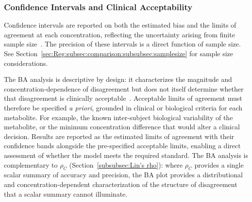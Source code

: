 \subsubsection{Confidence Intervals and Clinical Acceptability}
Confidence intervals are reported on both the estimated bias and the limits of agreement at each concentration, reflecting the uncertainty arising from finite sample size~\cite{Lu2016}. The precision of these intervals is a direct function of sample size. See Section~\ref{sec:Reg:subsec:comparison:subsubsec:samplesize} for sample size considerations.

The BA analysis is descriptive by design: it characterizes the magnitude and concentration-dependence of disagreement but does not itself determine whether that disagreement is clinically acceptable~\cite{Silveira2024}. Acceptable limits of agreement must therefore be specified \textit{a priori}, grounded in clinical or biological criteria for each metabolite. For example, the known inter-subject biological variability of the metabolite, or the minimum concentration difference that would alter a clinical decision. Results are reported as the estimated limits of agreement with their confidence bands alongside the pre-specified acceptable limits, enabling a direct assessment of whether the \DL model meets the required standard. The BA analysis is complementary to $\rho_C$ (Section~\ref{subsubsec:Lin's rho}): where $\rho_C$ provides a single scalar summary of accuracy and precision, the BA plot provides a distributional and concentration-dependent characterization of the structure of disagreement that a scalar summary cannot illuminate.

